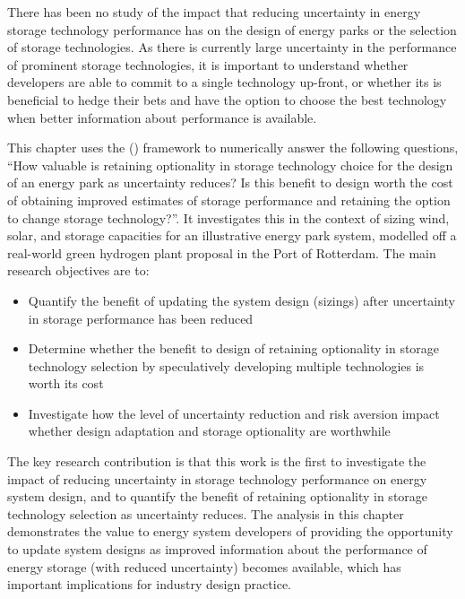 There has been no study of the impact that reducing uncertainty in energy storage technology performance has on the design of energy parks or the selection of storage technologies. As there is currently large uncertainty in the performance of prominent storage technologies, it is important to understand whether developers are able to commit to a single technology up-front, or whether its is beneficial to hedge their bets and have the option to choose the best technology when better information about performance is available.

This chapter uses the  () framework to numerically answer the following questions, ``How valuable is retaining optionality in storage technology choice for the design of an energy park as uncertainty reduces? Is this benefit to design worth the cost of obtaining improved estimates of storage performance and retaining the option to change storage technology?''. It investigates this in the context of sizing wind, solar, and storage capacities for an illustrative energy park system, modelled off a real-world green hydrogen plant proposal in the Port of Rotterdam.
The main research objectives are to:
\begin{itemize}
    \item Quantify the benefit of updating the system design (sizings) after uncertainty in storage performance has been reduced %
    \item Determine whether the benefit to design of retaining optionality in storage technology selection by speculatively developing multiple technologies is worth its cost
    \item Investigate how the level of uncertainty reduction and risk aversion impact whether design adaptation and storage optionality are worthwhile
\end{itemize}

The key research contribution is that this work is the first to investigate the impact of reducing uncertainty in storage technology performance on energy system design, and to quantify the benefit of retaining optionality in storage technology selection as uncertainty reduces. The analysis in this chapter demonstrates the value to energy system developers of providing the opportunity to update system designs as improved information about the performance of energy storage (with reduced uncertainty) becomes available, which has important implications for industry design practice.

